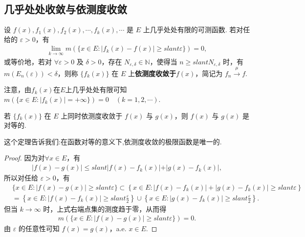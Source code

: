 \documentclass[../../main.tex]{subfiles}
\begin{document}
\subsection{几乎处处收敛与依测度收敛}

\begin{definition}
设 $f(x),f_1(x),f_2(x),\cdots,f_k(x),\cdots$ 是 $E$ 上几乎处处有限的可测函数. 若对任给的 $\varepsilon>0$，有
\begin{align}
\lim_{k\to\infty}m(\{x\in E:\vert f_k(x)-f(x)\vert \geqslant slant \varepsilon\}) = 0,\label{eq:3.7}
\end{align}
或等价地，若对 $\forall\varepsilon > 0$ 及 $\delta > 0$，存在 $N_{\varepsilon,\delta}\in\mathbb{N}$，使得当 $n\geqslant slant N_{\varepsilon,\delta}$ 时，有 $m(E_n(\varepsilon)) < \delta$，则称 $\{f_k(x)\}$ 在 $E$ 上\textbf{依测度收敛于}$f(x)$，简记为 $f_n\stackrel{\mu}{\longrightarrow}f$. 
\end{definition}
\begin{remark}
注意，由$f_k(x)$在$E$上几乎处处有限可知$m(\{x\in E:\vert f_k(x)\vert=+\infty\}) = 0\quad (k = 1,2,\cdots)$. 
\end{remark}

\begin{theorem}\label{theorem:依测度收敛的极限函数必唯一}
若 $\{f_k(x)\}$ 在 $E$ 上同时依测度收敛于 $f(x)$ 与 $g(x)$，则 $f(x)$ 与 $g(x)$ 是对等的.
\end{theorem}
\begin{note}
这个定理告诉我们:在函数对等的意义下,依测度收敛的极限函数是唯一的.
\end{note}
\begin{proof}
因为对$\forall x\in E$，有
\begin{align*}
\vert f(x)-g(x)\vert\leqslant slant\vert f(x)-f_k(x)\vert+\vert g(x)-f_k(x)\vert,
\end{align*}
所以对任给 $\varepsilon>0$，有
\begin{align*}
&\{x\in E:\left| f(x)-g(x) \right|\geqslant slant \varepsilon \}\subset \left\{ x\in E:\left| f\left( x \right) -f_k\left( x \right) \right|+\left| g\left( x \right) -f_k\left( x \right) \right|\geqslant slant \varepsilon \right\} 
\\
&=\left\{ x\in E:\left| f(x)-f_k(x) \right|\geqslant slant \frac{\varepsilon}{2} \right\} \cup \left\{ x\in E:\left| g(x)-f_k(x) \right|\geqslant slant \frac{\varepsilon}{2} \right\} .
\end{align*}
但当 $k\to\infty$ 时，上式右端点集的测度趋于零，从而得
\begin{align*}
m(\{x\in E:\vert f(x)-g(x)\vert\geqslant slant \varepsilon\}) = 0.
\end{align*}
由 $\varepsilon$ 的任意性可知 $f(x)=g(x)$，a.e. $x\in E$. 
\end{proof}
\end{document}
